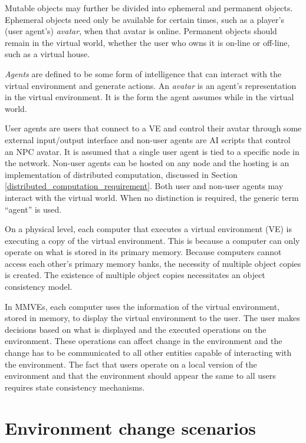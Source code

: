 Mutable objects may further be divided into ephemeral and permanent objects. Ephemeral objects need only be available for certain times, such as a player's (user agent's) \emph{avatar}, when that avatar is online. Permanent objects should remain in the virtual world, whether the user who owns it is on-line or off-line, such as a virtual house.

\emph{Agents} are defined to be some form of intelligence that can interact with the virtual environment and generate actions. An \emph{avatar} is an agent's representation in the virtual environment. It is the form the agent assumes while in the virtual world.

User agents are users that connect to a VE and control their avatar through some external input/output interface and non-user agents are AI scripts that control an NPC avatar. It is assumed that a single user agent is tied to a specific node in the network. Non-user agents can be hosted on any node and the hosting is an implementation of distributed computation, discussed in Section \ref{distributed_computation_requirement}. Both user and non-user agents may interact with the virtual world. When no distinction is required, the generic term ``agent'' is used.

On a physical level, each computer that executes a virtual environment (VE) is executing a copy of the virtual environment. This is because a computer can only operate on what is stored in its primary memory. Because computers cannot access each other's primary memory banks, the necessity of multiple object copies is created. The existence of multiple object copies necessitates an object consistency model.

In MMVEs, each computer uses the information of the virtual environment, stored in memory, to display the virtual environment to the user. The user makes decisions based on what is displayed and the executed operations on the environment. These operations can affect change in the environment and the change has to be communicated to all other entities capable of interacting with the environment. The fact that users operate on a local version of the environment and that the environment should appear the same to all users requires state consistency mechanisms.

\section{Environment change scenarios}
\label{environment_change_scenarios}

